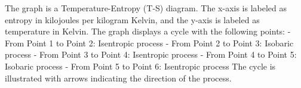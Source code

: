 The graph is a Temperature-Entropy (T-S) diagram. The x-axis is labeled as entropy in kilojoules per kilogram Kelvin, and the y-axis is labeled as temperature in Kelvin. The graph displays a cycle with the following points:
- From Point 1 to Point 2: Isentropic process
- From Point 2 to Point 3: Isobaric process
- From Point 3 to Point 4: Isentropic process
- From Point 4 to Point 5: Isobaric process
- From Point 5 to Point 6: Isentropic process
The cycle is illustrated with arrows indicating the direction of the process.
